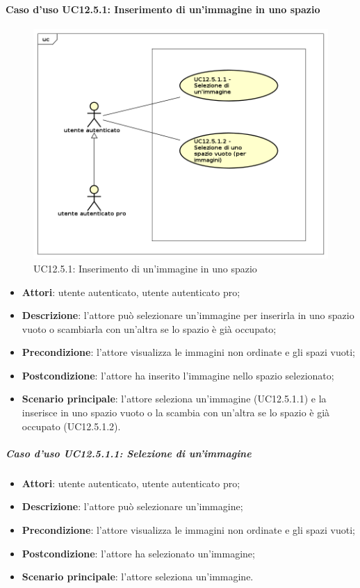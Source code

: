 \newpage
\paragraph{Caso d'uso UC12.5.1: Inserimento di un'immagine in uno spazio}
\begin{figure}[h]
	\centering
	\includegraphics[scale=0.5]{UML/UC12_5_1.png}
	\caption{UC12.5.1: Inserimento di un'immagine in uno spazio}
\end{figure}
\begin{itemize}
\item \textbf{Attori}: utente autenticato, utente autenticato pro;
\item \textbf{Descrizione}: l'attore può selezionare un'immagine per inserirla in uno spazio vuoto o scambiarla con un'altra se lo spazio è già occupato;
\item \textbf{Precondizione}: l'attore visualizza le immagini non ordinate e gli spazi vuoti;
\item \textbf{Postcondizione}: l'attore ha inserito l'immagine nello spazio selezionato;
\item \textbf{Scenario principale}: l'attore seleziona un'immagine (UC12.5.1.1) e la inserisce in uno spazio vuoto o la scambia con un'altra se lo spazio è già occupato (UC12.5.1.2).
\end{itemize}

\subparagraph{Caso d'uso UC12.5.1.1: Selezione di un'immagine}
\begin{itemize}
\item \textbf{Attori}: utente autenticato, utente autenticato pro;
\item \textbf{Descrizione}: l'attore può selezionare un'immagine;
\item \textbf{Precondizione}: l'attore visualizza le immagini non ordinate e gli spazi vuoti;
\item \textbf{Postcondizione}: l'attore ha selezionato un'immagine;
\item \textbf{Scenario principale}: l'attore seleziona un'immagine.
\end{itemize}


